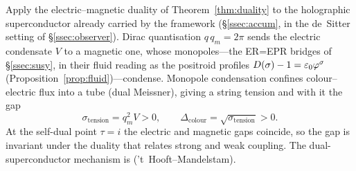 \begin{proposition}\label{prop:condensate}
Apply the electric--magnetic duality of Theorem~\ref{thm:duality} to the holographic
superconductor already carried by the framework (\S\ref{ssec:accum}, in the de~Sitter setting of
\S\ref{ssec:observer}). Dirac quantisation
$q\,q_m=2\pi$ sends the electric condensate $V$ to a magnetic one, whose monopoles---the ER=EPR
bridges of \S\ref{ssec:susy}, in their fluid reading as the positroid profiles
$D(\sigma)-1=\varepsilon_0\varphi^{\sigma}$ (Proposition~\ref{prop:fluid})---condense. Monopole
condensation confines colour--electric flux into a tube (dual Meissner), giving a string tension and
with it the gap
\begin{equation}\label{string_tension_positive}
  \sigma_{\mathrm{tension}}=q_m^{2}V>0,\qquad \Delta_{\mathrm{colour}}=\sqrt{\sigma_{\mathrm{tension}}}>0 .
\end{equation}
At the self-dual point $\tau=i$ the electric and magnetic gaps coincide, so the gap is invariant
under the duality that relates strong and weak coupling. The dual-superconductor mechanism 
is \cite{KogutSusskind} ('t~Hooft--Mandelstam).
\end{proposition}
